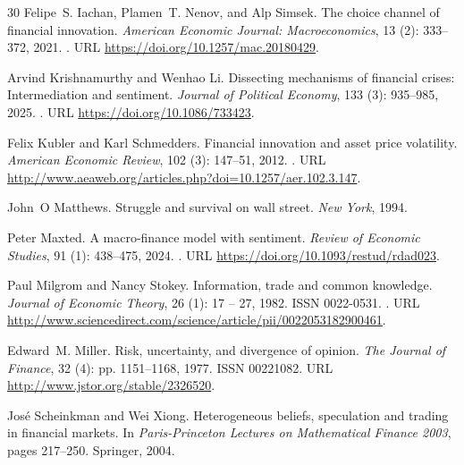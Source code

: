 \documentclass[11pt]{article}
\theoremstyle{plain}
\begin{document}
\begin{thebibliography}{30}
Felipe~S. Iachan, Plamen~T. Nenov, and Alp Simsek.
\newblock The choice channel of financial innovation.
\newblock \emph{American Economic Journal: Macroeconomics}, 13
  (2): 333--372, 2021.
\newblock {}.
\newblock URL \url{https://doi.org/10.1257/mac.20180429}.

Arvind Krishnamurthy and Wenhao Li.
\newblock Dissecting mechanisms of financial crises: Intermediation and
  sentiment.
\newblock \emph{Journal of Political Economy}, 133 (3):
  935--985, 2025.
\newblock {}.
\newblock URL \url{https://doi.org/10.1086/733423}.

Felix Kubler and Karl Schmedders.
\newblock Financial innovation and asset price volatility.
\newblock \emph{American Economic Review}, 102 (3): 147--51,
  2012.
\newblock {}.
\newblock URL
  \url{http://www.aeaweb.org/articles.php?doi=10.1257/aer.102.3.147}.

John~O Matthews.
\newblock Struggle and survival on wall street.
\newblock \emph{New York}, 1994.

Peter Maxted.
\newblock A macro-finance model with sentiment.
\newblock \emph{Review of Economic Studies}, 91 (1):
  438--475, 2024.
\newblock {}.
\newblock URL \url{https://doi.org/10.1093/restud/rdad023}.

Paul Milgrom and Nancy Stokey.
\newblock Information, trade and common knowledge.
\newblock \emph{Journal of Economic Theory}, 26 (1): 17 --
  27, 1982.
\newblock ISSN 0022-0531.
\newblock {}.
\newblock URL
  \url{http://www.sciencedirect.com/science/article/pii/0022053182900461}.

Edward~M. Miller.
\newblock Risk, uncertainty, and divergence of opinion.
\newblock \emph{The Journal of Finance}, 32 (4): pp.
  1151--1168, 1977.
\newblock ISSN 00221082.
\newblock URL \url{http://www.jstor.org/stable/2326520}.

Jos{\'e} Scheinkman and Wei Xiong.
\newblock Heterogeneous beliefs, speculation and trading in financial markets.
\newblock In \emph{Paris-Princeton Lectures on Mathematical Finance 2003},
  pages 217--250. Springer, 2004.


\end{thebibliography}
\end{document}

